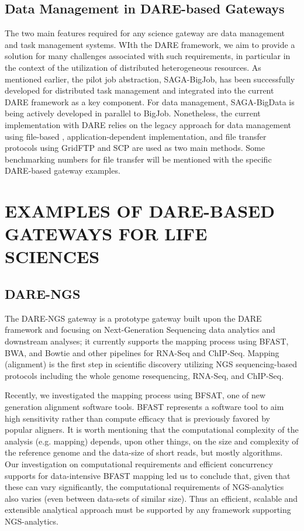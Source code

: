 \documentclass[]{svjour3}
\begin{document}
\subsection{Data Management in DARE-based Gateways}
The two main features required for any science gateway are data management and task management systems. WIth the DARE framework, we aim to provide a solution for many challenges associated with such requirements, in particular in the context of the utilization of distributed heterogeneous resources. As mentioned earlier, the pilot job abstraction, SAGA-BigJob, has been successfully developed for distributed task management and integrated into the current DARE framework as a key component.  For data management, SAGA-BigData is being actively developed in parallel to BigJob. Nonetheless, the current implementation with DARE relies on the legacy approach for data management using file-based , 
application-dependent implementation, and file transfer protocols using GridFTP and SCP are used as two main methods. Some 
benchmarking numbers for file transfer will be mentioned with the specific DARE-based gateway examples. 


\section{EXAMPLES OF DARE-BASED GATEWAYS FOR LIFE SCIENCES}


\subsection{DARE-NGS}
The DARE-NGS gateway %
is a prototype gateway built upon the DARE framework and focusing on Next-Generation Sequencing data analytics and downstream analyses; it currently supports the mapping
process using BFAST, BWA, and Bowtie and other pipelines for RNA-Seq and ChIP-Seq\cite{mardis2008-arghg,pepke2009}. Mapping (alignment) is the first
step in scientific discovery utilizing NGS sequencing-based protocols
including the whole genome resequencing, RNA-Seq, and ChIP-Seq. 

Recently, we investigated the mapping process using BFSAT, one of new generation alignment software tools. BFAST represents a software tool to aim high sensitivity rather than compute efficacy that is previously favored by popular aligners. It is worth mentioning that the computational complexity of the
analysis (e.g. mapping) depends, upon other things, on the size and
complexity of the reference genome and the data-size of short reads, but mostly algorithms\cite{ecmls11}.
Our investigation on computational requirements and efficient concurrency supports for data-intensive BFAST mapping led us to conclude that, given that these can vary significantly, the computational
requirements of NGS-analytics also varies (even between data-sets of
similar size). Thus an efficient, scalable and extensible analytical
approach must be supported by any framework supporting NGS-analytics.
\end{document}
